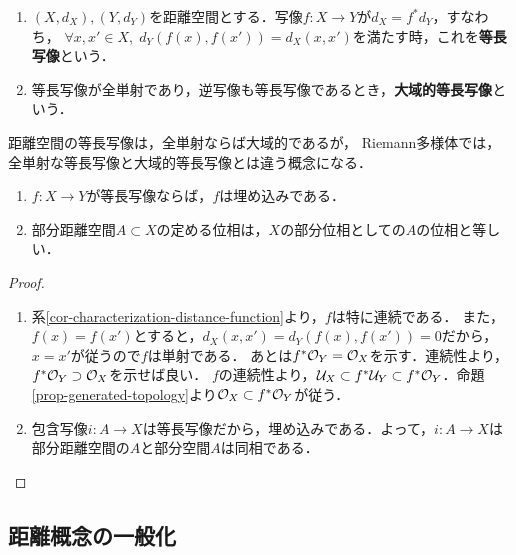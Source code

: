 \documentclass[uplatex,dvipdfmx]{jsreport}
\begin{document}
\begin{definition}\mbox{}
    \begin{enumerate}
        \item $(X,d_X),(Y,d_Y)$を距離空間とする．写像$f:X\to Y$が$d_X=f^*d_Y$，すなわち，
        $\forall x,x'\in X,\; d_Y(f(x),f(x'))=d_X(x,x')$を満たす時，これを\textbf{等長写像}という．
        \item 等長写像が全単射であり，逆写像も等長写像であるとき，\textbf{大域的等長写像}という．
    \end{enumerate}
\end{definition}
\begin{remark}
    距離空間の等長写像は，全単射ならば大域的であるが，
    Riemann多様体では，全単射な等長写像と大域的等長写像とは違う概念になる．
\end{remark}

\begin{proposition}\label{prop-部分距離空間のwell-definedness}\mbox{}
    \begin{enumerate}
        \item $f:X\to Y$が等長写像ならば，$f$は埋め込みである．
        \item 部分距離空間$A\subset X$の定める位相は，$X$の部分位相としての$A$の位相と等しい．
    \end{enumerate}
\end{proposition}
\begin{proof}\mbox{}
    \begin{enumerate}
        \item 系\ref{cor-characterization-distance-function}より，$f$は特に連続である．
        また，$f(x)=f(x')$とすると，$d_X(x,x')=d_Y(f(x),f(x'))=0$だから，$x=x'$が従うので$f$は単射である．
        あとは$f^*\mathcal{O}_Y=\mathcal{O}_X$を示す．連続性より，$f^*\mathcal{O}_Y\supset\mathcal{O}_X$を示せば良い．
        $f$の連続性より，$\mathcal{U}_X\subset f^*\mathcal{U}_Y\subset f^*\mathcal{O}_Y$．命題\ref{prop-generated-topology}より$\mathcal{O}_X\subset f^*\mathcal{O}_Y$が従う．
        \item 包含写像$i:A\to X$は等長写像だから，埋め込みである．よって，$i:A\to X$は部分距離空間の$A$と部分空間$A$は同相である．
    \end{enumerate}
\end{proof}

\subsection{距離概念の一般化}
\end{document}
